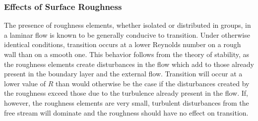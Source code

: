 \subsubsection{Effects of Surface Roughness}\label{ch3:sec:3.5.2}

The presence of roughness elements, whether isolated or
distributed in groups, in a laminar flow is known to be generally
conducive to transition. Under otherwise identical conditions,
transition occurs at a lower Reynolds number on a rough wall
than on a smooth one. This behavior follows from the theory
of stability, as the roughness elements create disturbances
in the flow which add to those already present in the boundary
layer and the external flow. Transition will occur at a lower
value of $R$ than would otherwise be the case if the disturbances
created by the roughness exceed those due to the turbulence
already present in the flow. If, however, the roughness elements
are very small, turbulent disturbances from the free stream
will dominate and the roughness should have no effect on transition.

